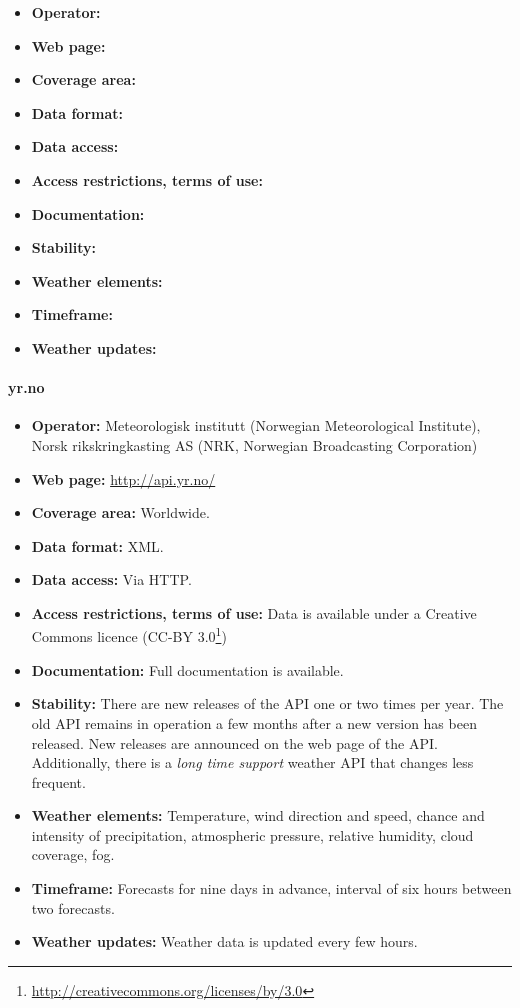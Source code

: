 \begin{itemize}
  \item \textbf{Operator:}
  \item \textbf{Web page:}
  \item \textbf{Coverage area:}
  \item \textbf{Data format:}
  \item \textbf{Data access:}
  \item \textbf{Access restrictions, terms of use:}
  \item \textbf{Documentation:}
  \item \textbf{Stability:}
  \item \textbf{Weather elements:}
  \item \textbf{Timeframe:}
  \item \textbf{Weather updates:}
\end{itemize}

\paragraph{yr.no}

\begin{itemize}
  \item \textbf{Operator:} Meteorologisk institutt (Norwegian Meteorological Institute), Norsk rikskringkasting AS (NRK, Norwegian Broadcasting Corporation)
  \item \textbf{Web page:} \href{http://api.yr.no/}{http://api.yr.no/}
  \item \textbf{Coverage area:} Worldwide.
  \item \textbf{Data format:} XML.
  \item \textbf{Data access:} Via HTTP.
  \item \textbf{Access restrictions, terms of use:} Data is available under a Creative Commons licence (CC-BY 3.0\footnote{\href{http://creativecommons.org/licenses/by/3.0}{http://creativecommons.org/licenses/by/3.0}})
  \item \textbf{Documentation:} Full documentation is available.
  \item \textbf{Stability:} There are new releases of the API one or two times per year. The old API remains in operation a few months after a new version has been released. New releases are announced on the web page of the API.\\
  Additionally, there is a \emph{long time support} weather API that changes less frequent.
  \item \textbf{Weather elements:} Temperature, wind direction and speed, chance and intensity of precipitation, atmospheric pressure, relative humidity, cloud coverage, fog.
  \item \textbf{Timeframe:} Forecasts for nine days in advance, interval of six hours between two forecasts.
  \item \textbf{Weather updates:} Weather data is updated every few hours.
\end{itemize}

